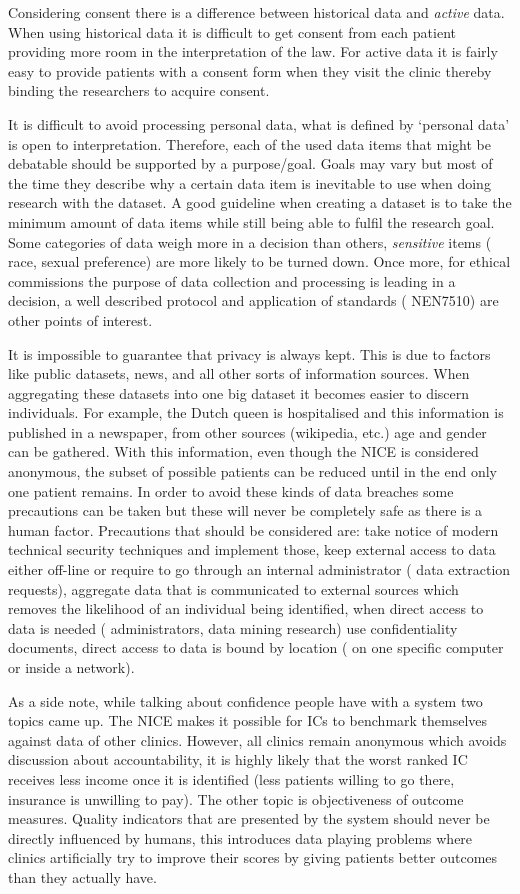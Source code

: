 Considering consent there is a difference between historical data and \emph{active} data.
When using historical data it is difficult to get consent from each patient providing more room in the interpretation of the law.
For active data it is fairly easy to provide patients with a consent form when they visit the clinic thereby binding the researchers to acquire consent.

It is difficult to avoid processing personal data, \ie{} what is defined by `personal data' is open to interpretation.
Therefore, each of the used data items that might be debatable should be supported by a purpose/goal. %
Goals may vary but most of the time they describe why a certain data item is inevitable to use when doing research with the dataset.
A good guideline when creating a dataset is to take the minimum amount of data items while still being able to fulfil the research goal.
Some categories of data weigh more in a decision than others, \emph{sensitive} items (\eg{} race, sexual preference) are more likely to be turned down.
Once more, for ethical commissions the purpose of data collection and processing is leading in a decision, a well described protocol and application of standards (\eg{} NEN7510) are other points of interest.

It is impossible to guarantee that privacy is always kept.
This is due to factors like public datasets, news, and all other sorts of information sources.
When aggregating these datasets into one big dataset it becomes easier to discern individuals. 
For example, the Dutch queen is hospitalised and this information is published in a newspaper, from other sources (wikipedia, etc.) age and gender can be gathered.
With this information, even though the NICE is considered anonymous, the subset of possible patients can be reduced until in the end only one patient remains.
In order to avoid these kinds of data breaches some precautions can be taken but these will never be completely safe as there is a human factor.
Precautions that should be considered are: take notice of modern technical security techniques and implement those, keep external access to data either off-line or require to go through an internal administrator (\eg{} data extraction requests), aggregate data that is communicated to external sources which removes the likelihood of an individual being identified, when direct access to data is needed (\eg{} administrators, data mining research) use confidentiality documents, direct access to data is bound by location (\eg{} on one specific computer or inside a network).

As a side note, while talking about confidence people have with a system two topics came up.
The NICE makes it possible for ICs to benchmark themselves against data of other clinics.
However, all clinics remain anonymous which avoids discussion about accountability, \eg{} it is highly likely that the worst ranked IC receives less income once it is identified (less patients willing to go there, insurance is unwilling to pay).
The other topic is objectiveness of outcome measures.
Quality indicators that are presented by the system should never be directly influenced by humans, this introduces data playing problems where clinics artificially try to improve their scores by giving patients better outcomes than they actually have.
